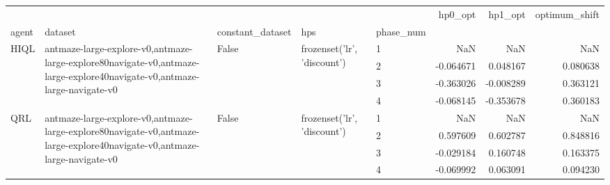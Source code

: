\begin{tabular}{lllllrrr}
\toprule
 &  &  &  &  & hp0_opt & hp1_opt & optimum_shift \\
agent & dataset & constant_dataset & hps & phase_num &  &  &  \\
\midrule
\multirow[t]{4}{*}{HIQL} & \multirow[t]{4}{*}{antmaze-large-explore-v0,antmaze-large-explore80navigate-v0,antmaze-large-explore40navigate-v0,antmaze-large-navigate-v0} & \multirow[t]{4}{*}{False} & \multirow[t]{4}{*}{frozenset({'lr', 'discount'})} & 1 & NaN & NaN & NaN \\
 &  &  &  & 2 & -0.064671 & 0.048167 & 0.080638 \\
 &  &  &  & 3 & -0.363026 & -0.008289 & 0.363121 \\
 &  &  &  & 4 & -0.068145 & -0.353678 & 0.360183 \\
\cline{1-8} \cline{2-8} \cline{3-8} \cline{4-8}
\multirow[t]{4}{*}{QRL} & \multirow[t]{4}{*}{antmaze-large-explore-v0,antmaze-large-explore80navigate-v0,antmaze-large-explore40navigate-v0,antmaze-large-navigate-v0} & \multirow[t]{4}{*}{False} & \multirow[t]{4}{*}{frozenset({'lr', 'discount'})} & 1 & NaN & NaN & NaN \\
 &  &  &  & 2 & 0.597609 & 0.602787 & 0.848816 \\
 &  &  &  & 3 & -0.029184 & 0.160748 & 0.163375 \\
 &  &  &  & 4 & -0.069992 & 0.063091 & 0.094230 \\
\cline{1-8} \cline{2-8} \cline{3-8} \cline{4-8}
\bottomrule
\end{tabular}
